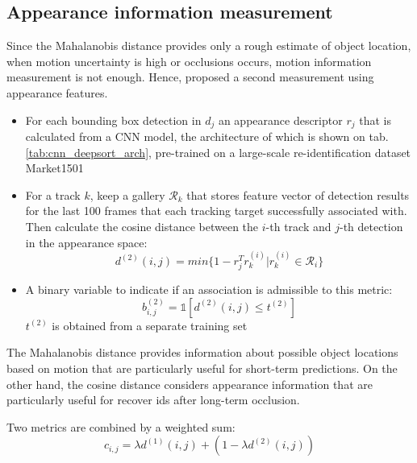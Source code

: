 \subsection{Appearance information measurement}
\hspace{0.5cm} Since the Mahalanobis distance provides only a rough estimate of object location, when motion uncertainty is high or occlusions occurs, motion information measurement is not enough. Hence, \cite{Wojke2017simple} proposed a second measurement using appearance features.\par
\begin{itemize}
    \item For each bounding box detection in $d_j$ an appearance descriptor $r_j$ that is calculated from a  \acrshort{CNN} model, 
    the architecture of which is shown on tab.\ref{tab:cnn_deepsort_arch}, pre-trained on a large-scale re-identification dataset Market1501
    
    \item For a track $k$, keep a gallery $\mathcal{R}_k$ that stores feature vector of detection results for the last 100 frames that each tracking target successfully associated with.
     Then calculate the cosine distance between the $i$-th track and $j$-th detection in the appearance space:
    \begin{equation}
        d^{(2)}(i,j) = min\{1 - r_j^Tr^{(i)}_k | r^{(i)}_k\in \mathcal{R}_i\}
    \end{equation}
    \item A binary variable to indicate if an association is admissible to this metric:
    \begin{equation}
        b^{(2)}_{i,j}=\mathbb{1}[d^{(2)}(i,j) \leq t^{(2)}]
    \end{equation}
    $t^{(2)}$ is obtained from a separate training set
\end{itemize}
\hspace{0.5cm}The Mahalanobis distance provides information about possible object locations based on motion that are particularly useful for short-term predictions. On the other hand, the cosine distance considers appearance information that are particularly useful for recover ids after long-term occlusion.\par
Two metrics are combined by a weighted sum:
\begin{equation}
    c_{i,j} = \lambda d^{(1)}(i,j) + (1-\lambda d^{(2)}(i,j))
\end{equation}

